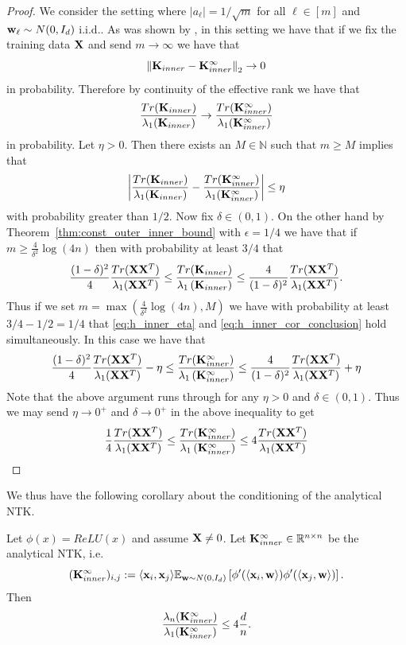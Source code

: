 \begin{proof}
We consider the setting where $|a_\ell| = 1/\sqrt{m}$ for all $\ell \in [m]$ and $\mathbf{w}_\ell \sim N(0, I_d)$ i.i.d.. 
As was shown by \cite{jacot_ntk}, \cite{du2018gradient} in this setting we have that if we fix the training data $\mathbf{X}$ and send $m \rightarrow \infty$ we have that
\[
\left\lVert\mathbf{K}_{inner} - \mathbf{K}_{inner}^\infty\right\rVert_2 \rightarrow 0 
\]
in probability. 
Therefore by continuity of the effective rank we have that 
\[ 
\frac{Tr(\mathbf{K}_{inner})}{\lambda_1(\mathbf{K}_{inner})} \rightarrow \frac{Tr(\mathbf{K}_{inner}^\infty)}{\lambda_1(\mathbf{K}_{inner}^\infty)} 
\]
in probability.  
Let $\eta > 0$.  Then there exists an $M \in \mathbb{N}$ such that $m \geq M$ implies that
\begin{equation}\label{eq:h_inner_eta}
\left\lvert\frac{Tr(\mathbf{K}_{inner})}{\lambda_1(\mathbf{K}_{inner})} - \frac{Tr(\mathbf{K}_{inner}^\infty)}{\lambda_1(\mathbf{K}_{inner}^\infty)}\right\rvert \leq \eta    
\end{equation}
with probability greater than $1/2$.  
Now fix $\delta \in (0,1)$.  On the other hand by Theorem~\ref{thm:const_outer_inner_bound} with $\epsilon = 1/4$ we have that if $m \geq \frac{4}{\delta^2}\log(4n)$ then with probability at least $3/4$ that
\begin{equation}\label{eq:h_inner_cor_conclusion}
\frac{(1 - \delta)^2}{4} \frac{Tr(\mathbf{X} \mathbf{X}^T)}{\lambda_1(\mathbf{X} \mathbf{X}^T)} \leq \frac{Tr(\mathbf{K}_{inner})}{\lambda_1 \left(\mathbf{K}_{inner}\right)} \leq \frac{4}{(1 - \delta)^2} \frac{Tr(\mathbf{X} \mathbf{X}^T)}{\lambda_1(\mathbf{X} \mathbf{X}^T)}.    
\end{equation}
Thus if we set $m = \max(\frac{4}{\delta^2}\log(4n), M)$ we have with probability at least $3/4 - 1/2 = 1/4$ that \eqref{eq:h_inner_eta} and \eqref{eq:h_inner_cor_conclusion} hold simultaneously.  In this case we have that
\[ \frac{(1 - \delta)^2}{4} \frac{Tr(\mathbf{X} \mathbf{X}^T)}{\lambda_1(\mathbf{X} \mathbf{X}^T)} - \eta \leq \frac{Tr(\mathbf{K}_{inner}^\infty)}{\lambda_1 \left(\mathbf{K}_{inner}^\infty\right)} \leq \frac{4}{(1 - \delta)^2} \frac{Tr(\mathbf{X} \mathbf{X}^T)}{\lambda_1(\mathbf{X} \mathbf{X}^T)} + \eta  \]
Note that the above argument runs through for any $\eta > 0$ and $\delta \in (0, 1)$.  Thus we may send $\eta \rightarrow 0^+$ and $\delta \rightarrow 0^+$ in the above inequality to get
\[ \frac{1}{4} \frac{Tr(\mathbf{X} \mathbf{X}^T)}{\lambda_1(\mathbf{X} \mathbf{X}^T)} \leq \frac{Tr(\mathbf{K}_{inner}^\infty)}{\lambda_1 \left(\mathbf{K}_{inner}^\infty\right)} \leq 4\frac{Tr(\mathbf{X} \mathbf{X}^T)}{\lambda_1(\mathbf{X} \mathbf{X}^T)} \]
\end{proof}
We thus have the following corollary about the conditioning of the analytical NTK.
\begin{corollary}
Let $\phi(x) = ReLU(x)$ and assume $\mathbf{X} \neq 0$.  Let $\mathbf{K}_{inner}^\infty \in \mathbb{R}^{n \times n}$ be the analytical NTK, i.e.
\[ (\mathbf{K}_{inner}^\infty)_{i, j} := \langle \mathbf{x}_i, \mathbf{x}_j \rangle \mathbb{E}_{\mathbf{w} \sim N(0, I_d)} \left[\phi'(\langle \mathbf{x}_i, \mathbf{w} \rangle) \phi'(\langle \mathbf{x}_j, \mathbf{w} \rangle)\right]. \]
Then
\[ \frac{\lambda_n(\mathbf{K}_{inner}^\infty)}{\lambda_1(\mathbf{K}_{inner}^\infty)} \leq 4 \frac{d}{n}. \]
\end{corollary}

